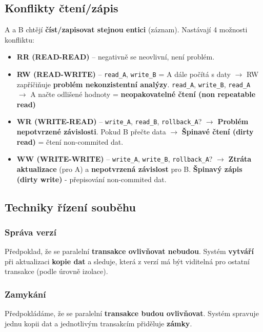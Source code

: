 \subsection{Konflikty čtení/zápis}
A a B chtějí \textbf{číst/zapisovat stejnou entici} (záznam). Nastávají 4 možnosti konfliktu:
\begin{itemize}
\item \textbf{RR (READ-READ)} -- negativně se neovlivní, není problém.
\item \textbf{RW (READ-WRITE)} -- \texttt{read\_A}, \texttt{write\_B} = A dále počítá s daty $\rightarrow$ RW zapříčiňuje \textbf{problém nekonzistentní analýzy}. \texttt{read\_A}, \texttt{write\_B}, \texttt{read\_A} $\rightarrow$ A načte odlišené hodnoty = \textbf{neopakovatelné čtení (non repeatable read)}
\item \textbf{WR (WRITE-READ)} -- \texttt{write\_A}, \texttt{read\_B}, \texttt{rollback\_A}? $\rightarrow$ \textbf{Problém nepotvrzené závislosti}. Pokud B přečte data $\rightarrow$ \textbf{Špinavé čtení (dirty read)} = čtení non-commited dat.
\item \textbf{WW (WRITE-WRITE)} -- \texttt{write\_A}, \texttt{write\_B}, \texttt{rollback\_A}? $\rightarrow$ \textbf{Ztráta aktualizace} (pro A) a \textbf{nepotvrzená závislost} pro B. \textbf{Špinavý zápis}\textbf{ (dirty write)} - přepisování non-commited dat.
\end{itemize}

\subsection{Techniky řízení souběhu}
\subsubsection{Správa verzí}
Předpoklad, že se paralelní \textbf{transakce ovlivňovat nebudou}. Systém \textbf{vytváří} při aktualizaci\textbf{ kopie dat }a sleduje, která z verzí má být viditelná pro ostatní transakce (podle úrovně izolace).

\subsubsection{Zamykání}
Předpokládáme, že se paralelní \textbf{transakce budou ovlivňovat}. Systém spravuje jednu kopii dat a jednotlivým transakcím přiděluje \textbf{zámky}.

